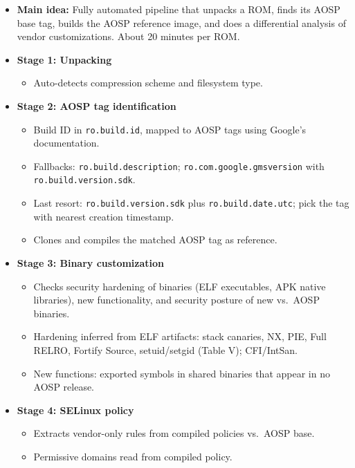 \documentclass[11pt,a4paper]{article}
\begin{document}
\begin{enumerate}
    \begin{itemize}[leftmargin=*,itemsep=1pt,topsep=2pt]
        \item \textbf{Main idea:} Fully automated pipeline that unpacks a ROM, finds its AOSP base tag, builds the AOSP reference image, and does a differential analysis of vendor customizations. About 20 minutes per ROM.
        \item \textbf{Stage 1: Unpacking}
        \begin{itemize}[itemsep=0pt]
            \item Auto-detects compression scheme and filesystem type.
        \end{itemize}
        \item \textbf{Stage 2: AOSP tag identification}
        \begin{itemize}[itemsep=0pt]
            \item Build ID in \texttt{ro.build.id}, mapped to AOSP tags using Google's documentation.
            \item Fallbacks: \texttt{ro.build.description}; \texttt{ro.com.google.gmsversion} with \texttt{ro.build.version.sdk}.
            \item Last resort: \texttt{ro.build.version.sdk} plus \texttt{ro.build.date.utc}; pick the tag with nearest creation timestamp.
            \item Clones and compiles the matched AOSP tag as reference.
        \end{itemize}
        \item \textbf{Stage 3: Binary customization}
        \begin{itemize}[itemsep=0pt]
            \item Checks security hardening of binaries (ELF executables, APK native libraries), new functionality, and security posture of new vs.\ AOSP binaries.
            \item Hardening inferred from ELF artifacts: stack canaries, NX, PIE, Full RELRO, Fortify Source, setuid/setgid (Table V); CFI/IntSan.
            \item New functions: exported symbols in shared binaries that appear in no AOSP release.
        \end{itemize}
        \item \textbf{Stage 4: SELinux policy}
        \begin{itemize}[itemsep=0pt]
            \item Extracts vendor-only rules from compiled policies vs.\ AOSP base.
            \item Permissive domains read from compiled policy.

\end{itemize}
\end{itemize}
\end{enumerate}
\end{document}
